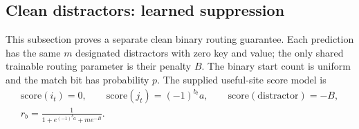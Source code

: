 \subsection{Clean distractors: learned suppression}
\label{app:J-clean}



This subsection proves a separate clean binary routing guarantee. Each prediction has the same $m$ designated distractors
with zero key and value; the only shared trainable routing parameter is their penalty $B$.
The binary start count is uniform and the match bit has probability $p$.
The supplied useful-site score model is
\begin{equation}
 \begin{gathered}
 \mathrm{score}(i_t)=0,\qquad \mathrm{score}(j_t)=(-1)^{b_t}a,\qquad
 \mathrm{score}(\text{distractor})=-B,\\
 r_b=\frac{1}{1+e^{(-1)^ba}+me^{-B}}.
 \end{gathered}
 \label{eq:J-clean-scores}
\end{equation}

